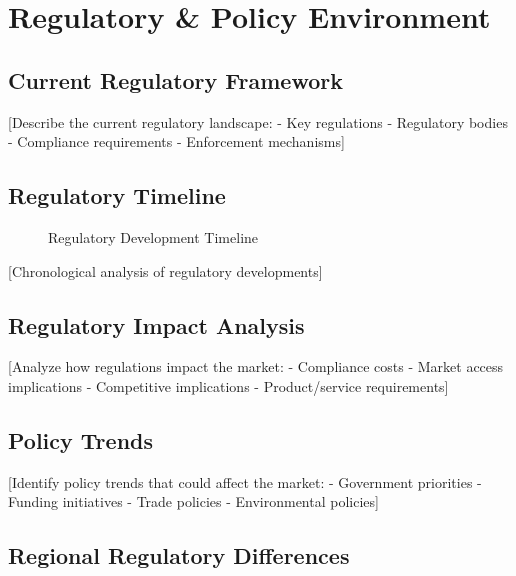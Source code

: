\documentclass[11pt,letterpaper]{report}
\begin{document}
\chapter{Regulatory \& Policy Environment}

\section{Current Regulatory Framework}

[Describe the current regulatory landscape:
- Key regulations
- Regulatory bodies
- Compliance requirements
- Enforcement mechanisms]

\section{Regulatory Timeline}


\begin{figure}[htbp]
\centering
\caption{Regulatory Development Timeline}
\label{fig:regulatory_timeline}
\end{figure}

[Chronological analysis of regulatory developments]

\section{Regulatory Impact Analysis}

[Analyze how regulations impact the market:
- Compliance costs
- Market access implications
- Competitive implications
- Product/service requirements]

\section{Policy Trends}

[Identify policy trends that could affect the market:
- Government priorities
- Funding initiatives
- Trade policies
- Environmental policies]

\section{Regional Regulatory Differences}
\end{document}
